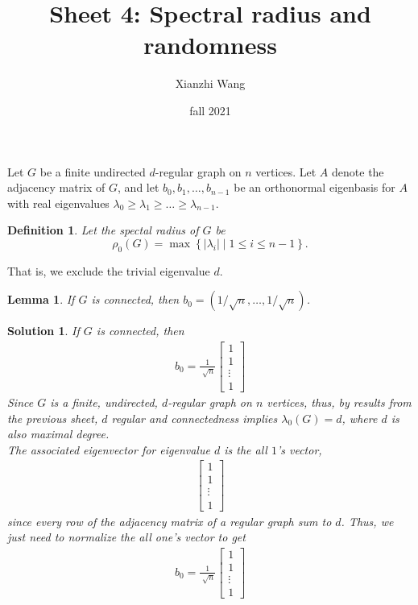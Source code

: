 \documentclass[12pt]{article}%
\newtheorem{definition}[theorem]{Definition}
\newtheorem{lemma}[theorem]{Lemma}
\newtheorem{solution}[theorem]{Solution}
\begin{document}
\title{Sheet 4: Spectral radius and randomness }
\author{Xianzhi Wang}
\date{fall 2021}
\maketitle

Let $G$ be a finite undirected $d$-regular graph on $n$ vertices. Let $A$
denote the adjacency matrix of $G$, and let $b_{0},b_{1},\ldots,b_{n-1}$ be an
orthonormal eigenbasis for $A$ with real eigenvalues $\lambda_{0}\geq
\lambda_{1}\geq\ldots\geq\lambda_{n-1}$.

\begin{definition}
Let the spectal radius of $G$ be
\[
\rho_{0}(G)=\max\left\{  \left\vert \lambda_{i}\right\vert \mid1\leq i\leq
n-1\right\}  \text{.}%
\]

\end{definition}

That is, we exclude the trivial eigenvalue $d$.

\begin{lemma}
If $G$ is connected, then 
$b_{0}=\left(  1/\sqrt{n},\ldots,1/\sqrt{n}\right)$.
\end{lemma}

\begin{solution}
    If $G$ is connected, then 
    \begin{align}
        b_0 = \frac{ 1 }{ \sqrt[]{n} }
        \begin{bmatrix}
            1\\
            1\\
            \vdots\\
            1
        \end{bmatrix}
    \end{align}
    Since $G$ is a finite, undirected, $d$-regular graph on $n$ vertices, 
    thus, by results from the previous sheet, $d$ regular and connectedness
    implies $\lambda_0 (G) = d$, where $d$ is also maximal degree.\\
    The associated eigenvector for eigenvalue $d$ is the all $1$'s vector,     
    \begin{align}
        \begin{bmatrix}
            1\\
            1\\
            \vdots\\
            1
        \end{bmatrix}
    \end{align}
    since every row of the adjacency matrix of a regular graph
    sum to $d$. Thus, we just need to normalize the all one's vector to get
    \begin{align}
        b_0 = \frac{ 1 }{ \sqrt[]{n} }
        \begin{bmatrix}
            1\\
            1\\
            \vdots\\
            1
        \end{bmatrix}
    \end{align}

    
\end{solution}
\end{document}
